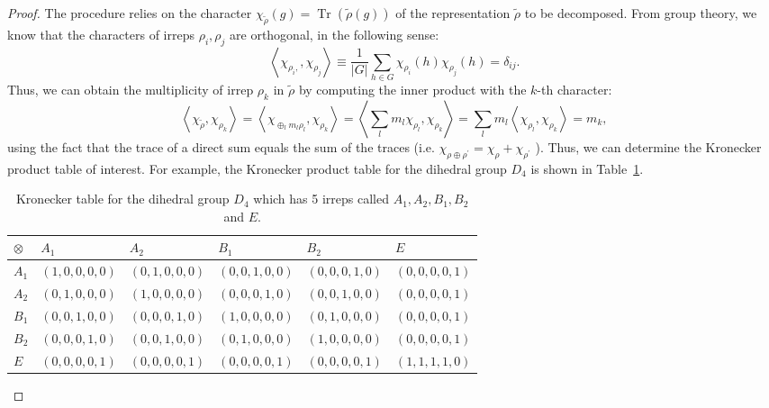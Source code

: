 \begin{proof}
    The procedure relies on the character $\chi_{\tilde \rho}(g)=\operatorname{Tr}(\tilde \rho(g))$ of the representation $\tilde \rho$ to be decomposed. From group theory, we know that the characters of irreps $\rho_i, \rho_j$ are orthogonal, in the following sense:
    \begin{equation}
    \left\langle\chi_{\rho_i,}, \chi_{\rho_j}\right\rangle \equiv \frac{1}{|G|} \sum_{h \in G} \chi_{\rho_i}(h) \chi_{\rho_j}(h)=\delta_{i j} .
    \end{equation}
    Thus, we can obtain the multiplicity of
    irrep $\rho_k$ in $\tilde \rho$ by computing the inner product with the $k$-th character:
    $$
    \left\langle\chi_{\tilde \rho}, \chi_{\rho_k}\right\rangle
    =
    \left\langle\chi_{\oplus_l m_l \rho_l}, \chi_{\rho_k}\right\rangle=\left\langle\sum_l m_l \chi_{\rho_l}, \chi_{\rho_k}\right\rangle
    =
    \sum_l m_l\left\langle\chi_{\rho_l}, \chi_{\rho_k}\right\rangle
    =m_k,
    $$
using the fact that the trace of a direct sum equals the sum of the traces (i.e. $\chi_{\rho \oplus \rho^{\prime}}=\chi_\rho+\chi_{\rho^{\prime}}$ ). Thus, we can determine the Kronecker product table of interest. For example, the Kronecker product table for the dihedral group $D_4$ is shown in Table~\ref{tab:kron-d4}.

\begin{table}[]
\centering
    \begin{tabular}{|l|l|l|l|l|l|}
    \hline
    $\otimes$ & $A_1$             & $A_2$             & $B_1$             & $B_2$             & $E$               \\ \hline
    $A_1$     & $(1, 0, 0, 0, 0)$ & $(0, 1, 0, 0, 0)$ & $(0, 0, 1, 0, 0)$ & $(0, 0, 0, 1, 0)$ & $(0, 0, 0, 0, 1)$ \\ \hline
    $A_2$     & $(0, 1, 0, 0, 0)$ & $(1, 0, 0, 0, 0)$ & $(0, 0, 0, 1, 0)$ & $(0, 0, 1, 0, 0)$ & $(0, 0, 0, 0, 1)$ \\ \hline
    $B_1$     & $(0, 0, 1, 0, 0)$ & $(0, 0, 0, 1, 0)$ & $(1, 0, 0, 0, 0)$ & $(0, 1, 0, 0, 0)$ & $(0, 0, 0, 0, 1)$ \\ \hline
    $B_2$     & $(0, 0, 0, 1, 0)$ & $(0, 0, 1, 0, 0)$ & $(0, 1, 0, 0, 0)$ & $(1, 0, 0, 0, 0)$ & $(0, 0, 0, 0, 1)$ \\ \hline
    $E$       & $(0, 0, 0, 0, 1)$ & $(0, 0, 0, 0, 1)$ & $(0, 0, 0, 0, 1)$ & $(0, 0, 0, 0, 1)$ & $(1, 1, 1, 1, 0)$ \\ \hline
    \end{tabular}
    \caption{Kronecker table for the dihedral group $D_4$ which has 5 irreps called $A_1, A_2, B_1, B_2$ and $E$.}
    \label{tab:kron-d4}
\end{table}


\end{proof}
